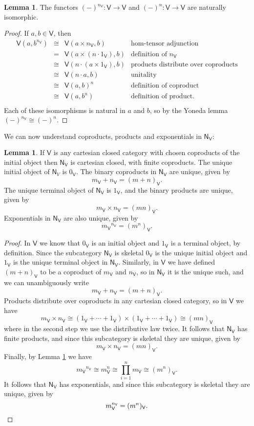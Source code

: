 \documentclass{amsart}
\theoremstyle{definition}
\newtheorem{lemma}[theorem]{Lemma}
\newcommand{\NN}{\mathsf{N}}
\newcommand{\V}{\mathsf{V}}
\newcommand{\maps}{\colon}
\begin{document}
\begin{lemma}
\label{lem:powers_1}
The functors $(-)^{n_\V} \maps \V\to \V$ and $(-)^n\maps \V\to \V$ are naturally isomorphic.  
\end{lemma}
\begin{proof}
If $a,b \in \V$, then
\[\begin{array}{rcll}
	\V(a,b^{n_\V}) & \cong & \V(a\times n_\V,b) & \text{hom-tensor adjunction}\\
	& = & \V(a\times (n \cdot 1_\V),b) & \text{definition of } n_\V\\ 
	& \cong & \V(n \cdot( a\times 1_\V), b) & \text{products distribute over coproducts}\\  
	& \cong & \V(n \cdot a,b) & \text{unitality}\\  
	& \cong & \V(a,b)^n & \text{definition of coproduct}\\
	& \cong & \V(a,b^n) & \text{definition of product}.\\
	\end{array}
\]
Each of these isomorphisms is natural in $a$ and $b$, so by the Yoneda lemma $(-)^{n_\V} \cong (-)^n$.
\end{proof}

We can now understand coproducts, products and exponentials in $\NN_\V$:

\begin{lemma}
\label{lem:NN}
If $\V$ is any cartesian closed category with chosen coproducts of the initial object then
$\NN_\V$ is cartesian closed, with finite coproducts.  The unique initial object of $\NN_V$
is $0_\V$.  The binary coproducts in $\NN_\V$ are unique, given by
\[     m_\V + n_\V = (m + n)_\V . \]
The unique terminal object of $\NN_\V$ is $1_\V$, and the binary products are unique, given by
\[      m_\V \times n_\V = (mn)_\V  .\]
Exponentials in $\NN_\V$ are also unique, given by 
\[     {m_\V}^{n_\V} = (m^n)_\V   .\]
\end{lemma}

\begin{proof}
 In $\V$ we know that $0_\V$ is an initial object and $1_\V$ is a terminal object, by
 definition.  Since the subcategory $\NN_\V$ is skeletal $0_\V$ is the unique 
 initial object and $1_\V$ is the unique terminal object in $\NN_\V$.   Similarly, in
 $\V$ we have defined $(m+n)_\V$ to be a coproduct of $m_\V$ and $n_\V$, so 
 in $\NN_\V$ it is the unique such, and we can unambiguously write 
 \[      m_\V + n_\V = (m + n)_\V .  \]
 Products distribute over coproducts in any cartesian closed category, so in $\V$ we have 
 \[   m_\V \times n_\V \cong (1_\V + \cdots + 1_\V) \times (1_\V + \cdots + 1_\V) 
 \cong (mn)_\V \]
 where in the second step we use the distributive law twice.
 It follows that $\NN_\V$ has finite products, and since this subcategory is skeletal
 they are unique, given by
 \[   m_\V \times n_\V = (mn)_\V.  \]
 Finally, by Lemma \ref{lem:powers_1} we have
 \[  {m_\V}^{n_\V} \cong m_\V^n \cong \prod_{i = 1}^n m_\V \cong
 (m^n)_\V .\]
 It follows that $\NN_\V$ has exponentials, and since this subcategory is skeletal they
 are unique, given by
 \[     m_\V^{n_\V} = (m^n)_\V .  \qedhere\]
\end{proof}
\end{document}
